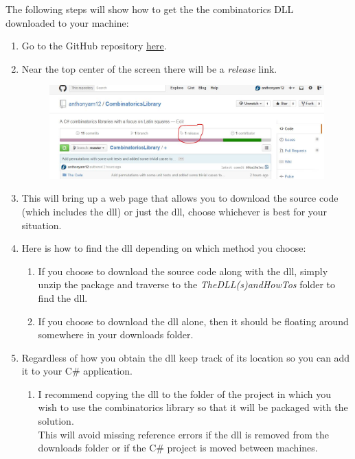 \documentclass {article}
\begin{document}
The following steps will show how to get the the combinatorics DLL\\ downloaded to your machine:
\begin{enumerate}
	\item Go to the GitHub repository \href{https://github.com/anthonyam12/CombinatoricsLibrary}{here}.
	\item Near the top center of the screen there will be a \textit{release} link.
	\begin{figure}[H]
		\centerline{\includegraphics[width=175mm, scale=1]{ReleaseLink.jpg}}
	\end{figure}
	\item This will bring up a web page that allows you to download the source code (which includes the dll) or just the dll, choose whichever is best for your situation.
	\item Here is how to find the dll depending on which method you choose:
	\begin {enumerate}
		\item If you choose to download the source code along with the dll, simply unzip the package and traverse to the \textit{TheDLL(s)andHowTos} folder to find the dll.
		\item If you choose to download the dll alone, then it should be floating around somewhere in your downloads folder.
	\end {enumerate}
	\item Regardless of how you obtain the dll keep track of its location so you can add it to your C\# application.
	\begin {enumerate}
		\item I recommend copying the dll to the folder of the project in which you wish to use the combinatorics library so that it will be packaged with the solution.\\
 		\vspace{2mm}
		This will avoid missing reference errors if the dll is removed from the downloads folder or if the C\# project is moved between machines. 
	\end 	{enumerate}

\end{enumerate}
\end{document}
